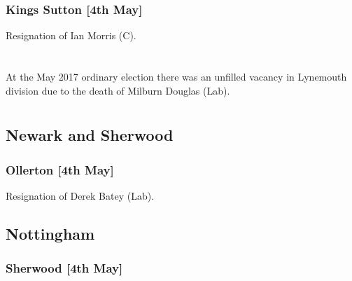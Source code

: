 \documentclass[a4paper,openany]{book}
\begin{document}
\begin{resultsiii}
\subsubsection*{Kings Sutton \hspace*{\fill}\nolinebreak[1]%
\enspace\hspace*{\fill}
[4th May]}


Resignation of Ian Morris (C).

\section[Northumberland]{}

At the May 2017 ordinary election there was an unfilled vacancy in Lynemouth division due to the death of Milburn Douglas (Lab).

\section[Nottinghamshire]{}

\subsection*{Newark and Sherwood}

\subsubsection*{Ollerton \hspace*{\fill}\nolinebreak[1]%
\enspace\hspace*{\fill}
[4th May]}


Resignation of Derek Batey (Lab).

\subsection*{Nottingham}

\subsubsection*{Sherwood \hspace*{\fill}\nolinebreak[1]%
\enspace\hspace*{\fill}
[4th May]}


\end{resultsiii}
\end{document}
